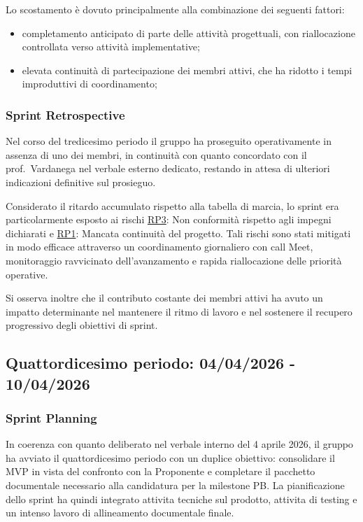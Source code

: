 \documentclass[a4paper, 11pt, oneside]{scrartcl} %
\begin{document}
Lo scostamento è dovuto principalmente alla combinazione dei seguenti fattori:
\begin{itemize}[noitemsep, topsep=2pt]
    \item completamento anticipato di parte delle attività progettuali, con riallocazione controllata verso attività implementative;
    \item elevata continuità di partecipazione dei membri attivi, che ha ridotto i tempi improduttivi di coordinamento;
\end{itemize}

\subsubsection*{Sprint Retrospective}

Nel corso del tredicesimo periodo il gruppo ha proseguito operativamente in assenza di uno dei membri, in continuità con quanto concordato con il prof.~Vardanega nel verbale esterno dedicato, restando in attesa di ulteriori indicazioni definitive sul prosieguo.

Considerato il ritardo accumulato rispetto alla tabella di marcia, lo sprint era particolarmente esposto ai rischi \hyperref[sec:rp3]{RP3}: Non conformità rispetto agli impegni dichiarati e \hyperref[sec:rp1]{RP1}: Mancata continuità del progetto. Tali rischi sono stati mitigati in modo efficace attraverso un coordinamento giornaliero con call Meet, monitoraggio ravvicinato dell'avanzamento e rapida riallocazione delle priorità operative.

Si osserva inoltre che il contributo costante dei membri attivi ha avuto un impatto determinante nel mantenere il ritmo di lavoro e nel sostenere il recupero progressivo degli obiettivi di sprint.

\newpage

\subsection{Quattordicesimo periodo: 04/04/2026 - 10/04/2026}

\subsubsection*{Sprint Planning}

In coerenza con quanto deliberato nel verbale interno del 4 aprile 2026, il gruppo ha avviato il quattordicesimo periodo con un duplice obiettivo: consolidare il MVP in vista del confronto con la Proponente e completare il pacchetto documentale necessario alla candidatura per la milestone PB. La pianificazione dello sprint ha quindi integrato attivita tecniche sul prodotto, attivita di testing e un intenso lavoro di allineamento documentale finale.
\end{document}
